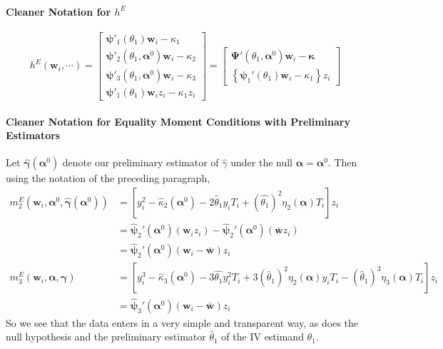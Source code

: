 \documentclass[12pt]{article}
\begin{document}
\paragraph{Cleaner Notation for $h^E$} 
\[
  h^E(\mathbf{w}_i, \cdots) = \left[
 \begin{array}{l}
   \boldsymbol{\psi}'_1(\theta_1)\mathbf{w}_i - \kappa_1\\
   \boldsymbol{\psi}'_2(\theta_1,\boldsymbol{\alpha}^0)\mathbf{w}_i - \kappa_2\\
   \boldsymbol{\psi}'_3(\theta_1,\boldsymbol{\alpha}^0)\mathbf{w}_i - \kappa_3\\ 
   \boldsymbol{\psi}'_1(\theta_1)\mathbf{w}_i z_i - \kappa_1 z_i
 \end{array}
 \right] = \left[
 \begin{array}{l}
   \boldsymbol{\Psi}'(\theta_1, \boldsymbol{\alpha}^0) \mathbf{w}_i - \boldsymbol{\kappa}\\
   \left\{\boldsymbol{\psi}_1'(\theta_1)\mathbf{w}_i - \kappa_1\right\}z_i
 \end{array}
 \right]
\]

\paragraph{Cleaner Notation for Equality Moment Conditions with Preliminary Estimators}
Let $\widehat{\boldsymbol{\gamma}}(\boldsymbol{\alpha}^0)$ denote our preliminary estimator of $\widehat{\gamma}$ under the null $\boldsymbol{\alpha} = \boldsymbol{\alpha}^0$. 
Then using the notation of the preceding paragraph,
\begin{align*}
  m_2^E\left(\mathbf{w}_i, \boldsymbol{\alpha}^0, \widehat{\boldsymbol{\gamma}}(\boldsymbol{\alpha}^0)\right) &= \left[y_i^2 - \widehat{\kappa}_2(\boldsymbol{\alpha}^0) - 2 \widehat{\theta}_1 y_i T_i + (\widehat{\theta_1})^2 \eta_2(\boldsymbol{\alpha}) T_i\right] z_i \\
  &= \widehat{\boldsymbol{\psi}}_2'(\boldsymbol{\alpha}^0)(\mathbf{w}_i z_i) - \widehat{\boldsymbol{\psi}}_2'(\boldsymbol{\alpha}^0) (\bar{\mathbf{w}} z_i)\\
  &= \widehat{\boldsymbol{\psi}}_2'(\boldsymbol{\alpha}^0)(\mathbf{w}_i - \bar{\mathbf{w}})z_i \\
  m_3^E(\mathbf{w}_i, \boldsymbol{\alpha}, \boldsymbol{\gamma}) &= \left[ y_i^3 - \widehat{\kappa}_3(\boldsymbol{\alpha}^0) - 3\widehat{\theta_1}  y_i^2 T_i + 3 (\widehat{\theta}_1)^2 \eta_2(\boldsymbol{\alpha})y_iT_i -  (\widehat{\theta}_1)^3\eta_3(\boldsymbol{\alpha}) T_i\right]z_i\\
  &= \widehat{\boldsymbol{\psi}}_3'(\boldsymbol{\alpha}^0)(\mathbf{w}_i - \bar{\mathbf{w}})z_i 
\end{align*}
So we see that the data enters in a very simple and transparent way, as does the null hypothesis and the preliminary estimator $\widehat{\theta}_1$ of the IV estimand $\theta_1$.
\end{document}
